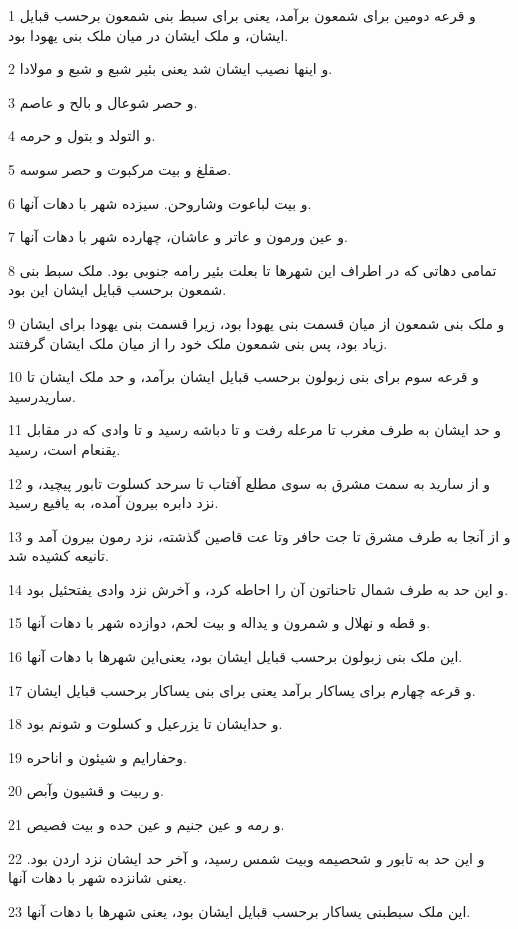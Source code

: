 \par 1 و قرعه دومین برای شمعون برآمد، یعنی برای سبط بنی شمعون برحسب قبایل ایشان، و ملک ایشان در میان ملک بنی یهودا بود.
\par 2 و اینها نصیب ایشان شد یعنی بئیر شبع و شبع و مولادا.
\par 3 و حصر شوعال و بالح و عاصم.
\par 4 و التولد و بتول و حرمه.
\par 5 صقلغ و بیت مرکبوت و حصر سوسه.
\par 6 و بیت لباعوت وشاروحن. سیزده شهر با دهات آنها.
\par 7 و عین ورمون و عاتر و عاشان، چهارده شهر با دهات آنها.
\par 8 تمامی دهاتی که در اطراف این شهرها تا بعلت بئیر رامه جنوبی بود. ملک سبط بنی شمعون برحسب قبایل ایشان این بود.
\par 9 و ملک بنی شمعون از میان قسمت بنی یهودا بود، زیرا قسمت بنی یهودا برای ایشان زیاد بود، پس بنی شمعون ملک خود را از میان ملک ایشان گرفتند.
\par 10 و قرعه سوم برای بنی زبولون برحسب قبایل ایشان برآمد، و حد ملک ایشان تا ساریدرسید. 
\par 11 و حد ایشان به طرف مغرب تا مرعله رفت و تا دباشه رسید و تا وادی که در مقابل یقنعام است، رسید.
\par 12 و از سارید به سمت مشرق به سوی مطلع آفتاب تا سرحد کسلوت تابور پیچید، و نزد دابره بیرون آمده، به یافیع رسید.
\par 13 و از آنجا به طرف مشرق تا جت حافر وتا عت قاصین گذشته، نزد رمون بیرون آمد و تانیعه کشیده شد.
\par 14 و این حد به طرف شمال تاحناتون آن را احاطه کرد، و آخرش نزد وادی یفتحئیل بود.
\par 15 و قطه و نهلال و شمرون و یداله و بیت لحم، دوازده شهر با دهات آنها.
\par 16 این ملک بنی زبولون برحسب قبایل ایشان بود، یعنی‌این شهرها با دهات آنها.
\par 17 و قرعه چهارم برای یساکار برآمد یعنی برای بنی یساکار برحسب قبایل ایشان.
\par 18 و حدایشان تا یزرعیل و کسلوت و شونم بود.
\par 19 وحفارایم و شیئون و اناحره.
\par 20 و ربیت و قشیون وآبص.
\par 21 و رمه و عین جنیم و عین حده و بیت فصیص.
\par 22 و این حد به تابور و شحصیمه وبیت شمس رسید، و آخر حد ایشان نزد اردن بود. یعنی شانزده شهر با دهات آنها.
\par 23 این ملک سبطبنی یساکار برحسب قبایل ایشان بود، یعنی شهرها با دهات آنها.
